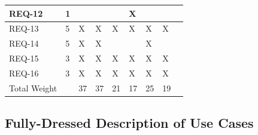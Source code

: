 \documentclass[letterpaper,english, 12pt]{scrreprt}
\begin{document}
\begin{center}
\begin{tabular}{|C{1cm}|C{1cm}|C{1cm}|C{1cm}|C{1cm}|C{1cm}|C{1cm}|C{1cm}|C{1cm}|}
			            REQ-12 & 1 &   &   &   & X &   &   & \\
                \hline
                        REQ-13 & 5 & X & X & X & X & X & X & \\
                \hline
                        REQ-14 & 5 & X & X &   &   & X &   & \\
                \hline
                        REQ-15 & 3 & X & X & X & X & X & X & \\
                \hline
                        REQ-16 & 3 & X & X & X & X & X & X & \\
                \hline
                  Total Weight &   & 37& 37& 21& 17& 25& 19& \\
                \hline
        \end{tabular}
\end{center}


\subsection{Fully-Dressed Description of Use Cases}
\end{document}
